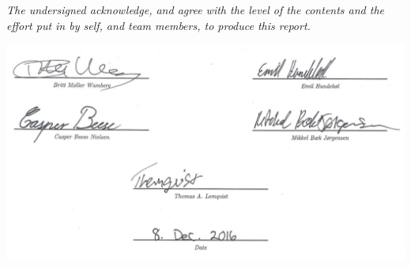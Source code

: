 \textit{\huge{The undersigned acknowledge, and agree with the level of the contents and the effort put in by self, and team members, to produce this report.}}
\vfill

\begin{center}
	\includegraphics{images/signatures}
\end{center}

\vfill